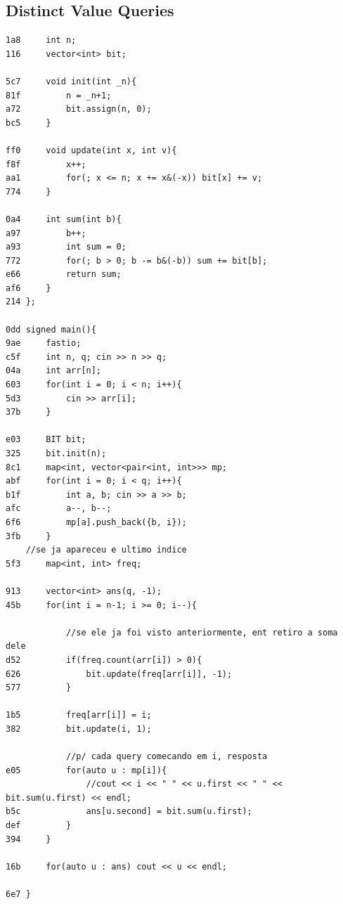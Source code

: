 \documentclass[11pt, a4paper, twoside]{article}
\begin{document}
\subsection{Distinct Value Queries}
\begin{lstlisting}
1a8     int n;
116     vector<int> bit;
 
5c7     void init(int _n){
81f         n = _n+1;
a72         bit.assign(n, 0);
bc5     }
 
ff0     void update(int x, int v){
f8f         x++;
aa1         for(; x <= n; x += x&(-x)) bit[x] += v;
774     }
 
0a4     int sum(int b){
a97         b++;
a93         int sum = 0;
772         for(; b > 0; b -= b&(-b)) sum += bit[b];
e66         return sum;
af6     }
214 };
     
0dd signed main(){
9ae     fastio;
c5f     int n, q; cin >> n >> q;
04a     int arr[n];
603     for(int i = 0; i < n; i++){
5d3         cin >> arr[i];
37b     }
 
e03     BIT bit;
325     bit.init(n);
8c1     map<int, vector<pair<int, int>>> mp;
abf     for(int i = 0; i < q; i++){
b1f         int a, b; cin >> a >> b;
afc         a--, b--;
6f6         mp[a].push_back({b, i});
3fb     }
    //se ja apareceu e ultimo indice
5f3     map<int, int> freq;
 
913     vector<int> ans(q, -1);
45b     for(int i = n-1; i >= 0; i--){
            
            //se ele ja foi visto anteriormente, ent retiro a soma dele
d52         if(freq.count(arr[i]) > 0){
626             bit.update(freq[arr[i]], -1);
577         }
     
1b5         freq[arr[i]] = i;
382         bit.update(i, 1);
     
            //p/ cada query comecando em i, resposta 
e05         for(auto u : mp[i]){
                //cout << i << " " << u.first << " " << bit.sum(u.first) << endl; 
b5c             ans[u.second] = bit.sum(u.first);
def         }
394     }
 
16b     for(auto u : ans) cout << u << endl;
 
6e7 }
\end{lstlisting}
\end{document}
